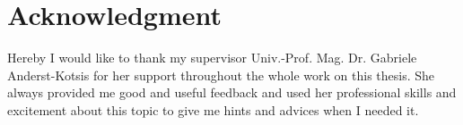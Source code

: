 \chapter*{Acknowledgment}

Hereby I would like to thank my supervisor Univ.-Prof. Mag. Dr. Gabriele Anderst-Kotsis for her support throughout the whole work on this thesis. She always provided me good and useful feedback and used her professional skills and excitement about this topic to give me hints and advices when I needed it.
\fi

